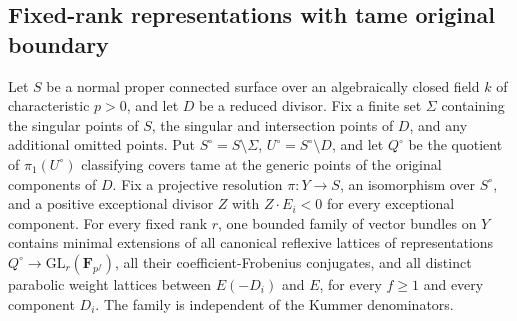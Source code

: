 \subsection{Fixed-rank representations with tame original boundary}
\begin{proposition}
\label{D:tame-parabolic-boundedness}
Let $S$ be a normal proper connected surface over an algebraically closed field $k$ of characteristic $p>0$, and let $D$ be a reduced divisor. Fix a finite set $\Sigma$ containing the singular points of $S$, the singular and intersection points of $D$, and any additional omitted points. Put $S^\circ=S\setminus\Sigma$, $U^\circ=S^\circ\setminus D$, and let $Q^\circ$ be the quotient of $\pi_1(U^\circ)$ classifying covers tame at the generic points of the original components of $D$. Fix a projective resolution $\pi:Y\to S$, an isomorphism over $S^\circ$, and a positive exceptional divisor $Z$ with $Z\cdot E_i<0$ for every exceptional component.
For every fixed rank $r$, one bounded family of vector bundles on $Y$ contains minimal extensions of all canonical reflexive lattices of representations $Q^\circ\to\mathrm{GL}_r(\mathbf F_{p^f})$, all their coefficient-Frobenius conjugates, and all distinct parabolic weight lattices between $E(-D_i)$ and $E$, for every $f\ge1$ and every component $D_i$. The family is independent of the Kummer denominators.
\end{proposition}
